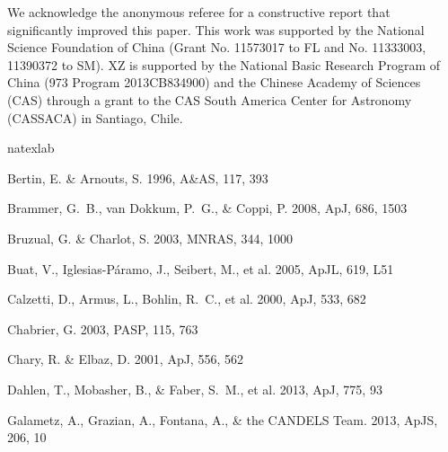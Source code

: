 \documentclass[twocolumn]{aastex61}
\begin{document}
\acknowledgments

We acknowledge the anonymous referee for a constructive report that significantly
improved this paper. 
This work was supported by the National Science Foundation of China (Grant No. 11573017 to FL 
and No. 11333003, 11390372 to SM). XZ is supported by the National Basic Research Program of 
China (973 Program 2013CB834900) and the Chinese Academy of Sciences (CAS) through a grant 
to the CAS South America Center for Astronomy (CASSACA) in Santiago, Chile.

\nocite{*}
%
%
\begin{thebibliography}{34}
\expandafter\ifx\csname natexlab\endcsname\relax\def\natexlab#1{#1}\fi

{Bertin}, E. \& {Arnouts}, S. 1996, A\&AS, 117, 393

{Brammer}, G.~B., {van Dokkum}, P.~G., \& {Coppi}, P. 2008, ApJ, 686, 1503

{Bruzual}, G. \& {Charlot}, S. 2003, MNRAS, 344, 1000

{Buat}, V., {Iglesias-P{\'a}ramo}, J., {Seibert}, M., et al. 2005, ApJL, 619, L51

{Calzetti}, D., {Armus}, L., {Bohlin}, R.~C., et al. 2000, ApJ, 533, 682

{Chabrier}, G. 2003, PASP, 115, 763

{Chary}, R. \& {Elbaz}, D. 2001, ApJ, 556, 562

{Dahlen}, T., {Mobasher}, B., \& {Faber}, S.~M., et al. 2013, ApJ, 775, 93

{Galametz}, A., {Grazian}, A., {Fontana}, A., \& {the CANDELS Team}. 2013,
  ApJS, 206, 10


\end{thebibliography}
\end{document}
